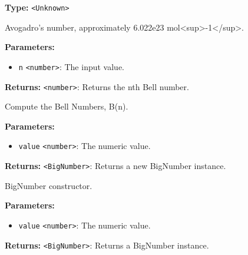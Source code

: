 \documentclass[12pt,a4paper]{article}
\begin{document}
\vspace{5mm}
\noindent {}\vspace{4mm}


\noindent \textbf{Type:} \texttt{<Unknown>}

\noindent Avogadro's number, approximately \textasciigrave{}6.022e23\textasciigrave{} mol<sup>-1</sup>.

\vspace{5mm}
\noindent {}


\noindent \textbf{Parameters:}
\begin{itemize}
  \item \texttt{n} \texttt{<number>}: The input value.
\end{itemize}

\noindent \textbf{Returns:} \texttt{<number>}: Returns the nth Bell number.

\noindent Compute the Bell Numbers, \textasciigrave{}B(n)\textasciigrave{}.

\vspace{5mm}
\noindent {}


\noindent \textbf{Parameters:}
\begin{itemize}
  \item \texttt{value} \texttt{<number>}: The numeric value.
\end{itemize}

\noindent \textbf{Returns:} \texttt{<BigNumber>}: Returns a new BigNumber instance.

\noindent BigNumber constructor.

\vspace{5mm}
\noindent {}


\noindent \textbf{Parameters:}
\begin{itemize}
  \item \texttt{value} \texttt{<number>}: The numeric value.
\end{itemize}

\noindent \textbf{Returns:} \texttt{<BigNumber>}: Returns a BigNumber instance.
\end{document}
